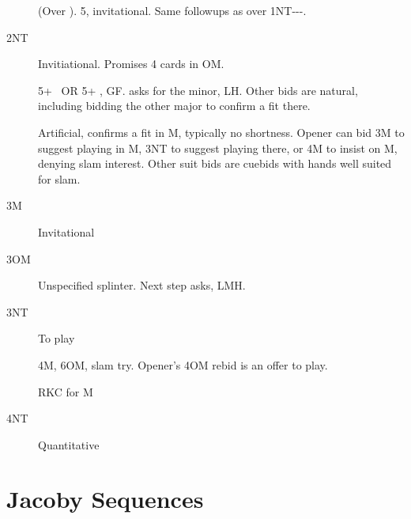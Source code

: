 \documentclass[tom-ari]{subfiles}
\begin{document}
\begin{description}
  \item[] (Over ). 5\spadesuit, invitational. Same followups as over 1NT---.
  \item[2NT] Invitiational. Promises 4 cards in OM.
  \item[] 5+ \clubsuit ~OR 5+ \diamondsuit, GF.  asks for the minor, LH. Other bids are natural, including bidding the other major to confirm a fit there.
  \item[] Artificial, confirms a fit in M, typically no shortness. Opener can bid 3M to suggest playing in M, 3NT to suggest playing there, or 4M to insist on M, denying slam interest. Other suit bids are cuebids with hands well suited for slam.
  \item[3M] Invitational
  \item[3OM] Unspecified splinter. Next step asks, LMH.
  \item[3NT] To play
  \item[] 4M, 6OM, slam try. Opener's 4OM rebid is an offer to play.
  \item[] RKC for M
  \item[4NT] Quantitative
\end{description}

\section{Jacoby Sequences}
\end{document}

